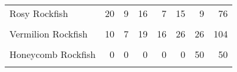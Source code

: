 \documentclass[
]{article}
\begin{document}
\begin{table}
\begin{tabular}[t]{lrrrrrrr}
Rosy Rockfish & 20 & 9 & 16 & 7 & 15 & 9 & 76\\
\cellcolor{gray!6}{Treefish} & \cellcolor{gray!6}{0} & \cellcolor{gray!6}{0} & \cellcolor{gray!6}{7} & \cellcolor{gray!6}{7} & \cellcolor{gray!6}{26} & \cellcolor{gray!6}{14} & \cellcolor{gray!6}{54}\\
\addlinespace
Vermilion Rockfish & 10 & 7 & 19 & 16 & 26 & 26 & 104\\
\cellcolor{gray!6}{Yellowtail Rockfish} & \cellcolor{gray!6}{14} & \cellcolor{gray!6}{12} & \cellcolor{gray!6}{20} & \cellcolor{gray!6}{7} & \cellcolor{gray!6}{0} & \cellcolor{gray!6}{0} & \cellcolor{gray!6}{53}\\
Honeycomb Rockfish & 0 & 0 & 0 & 0 & 0 & 50 & 50\\
\cellcolor{gray!6}{Starry Rockfish} & \cellcolor{gray!6}{0} & \cellcolor{gray!6}{0} & \cellcolor{gray!6}{0} & \cellcolor{gray!6}{0} & \cellcolor{gray!6}{7} & \cellcolor{gray!6}{5} & \cellcolor{gray!6}{12}\\
\bottomrule
\end{tabular}
\end{table}
\end{document}
